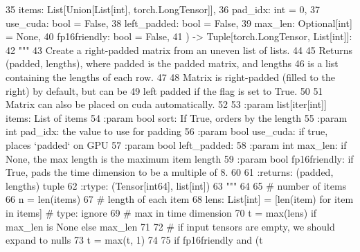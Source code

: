 \begin{DoxyCode}
35     items: List[Union[List[int], torch.LongTensor]],
36     pad\_idx: int = 0,
37     use\_cuda: bool = \textcolor{keyword}{False},
38     left\_padded: bool = \textcolor{keyword}{False},
39     max\_len: Optional[int] = \textcolor{keywordtype}{None},
40     fp16friendly: bool = \textcolor{keyword}{False},
41 ) -> Tuple[torch.LongTensor, List[int]]:
42     \textcolor{stringliteral}{"""}
43 \textcolor{stringliteral}{    Create a right-padded matrix from an uneven list of lists.}
44 \textcolor{stringliteral}{}
45 \textcolor{stringliteral}{    Returns (padded, lengths), where padded is the padded matrix, and lengths}
46 \textcolor{stringliteral}{    is a list containing the lengths of each row.}
47 \textcolor{stringliteral}{}
48 \textcolor{stringliteral}{    Matrix is right-padded (filled to the right) by default, but can be}
49 \textcolor{stringliteral}{    left padded if the flag is set to True.}
50 \textcolor{stringliteral}{}
51 \textcolor{stringliteral}{    Matrix can also be placed on cuda automatically.}
52 \textcolor{stringliteral}{}
53 \textcolor{stringliteral}{    :param list[iter[int]] items: List of items}
54 \textcolor{stringliteral}{    :param bool sort: If True, orders by the length}
55 \textcolor{stringliteral}{    :param int pad\_idx: the value to use for padding}
56 \textcolor{stringliteral}{    :param bool use\_cuda: if true, places `padded` on GPU}
57 \textcolor{stringliteral}{    :param bool left\_padded:}
58 \textcolor{stringliteral}{    :param int max\_len: if None, the max length is the maximum item length}
59 \textcolor{stringliteral}{    :param bool fp16friendly: if True, pads the time dimension to be a multiple of 8.}
60 \textcolor{stringliteral}{}
61 \textcolor{stringliteral}{    :returns: (padded, lengths) tuple}
62 \textcolor{stringliteral}{    :rtype: (Tensor[int64], list[int])}
63 \textcolor{stringliteral}{    """}
64 
65     \textcolor{comment}{# number of items}
66     n = len(items)
67     \textcolor{comment}{# length of each item}
68     lens: List[int] = [len(item) \textcolor{keywordflow}{for} item \textcolor{keywordflow}{in} items]  \textcolor{comment}{# type: ignore}
69     \textcolor{comment}{# max in time dimension}
70     t = max(lens) \textcolor{keywordflow}{if} max\_len \textcolor{keywordflow}{is} \textcolor{keywordtype}{None} \textcolor{keywordflow}{else} max\_len
71 
72     \textcolor{comment}{# if input tensors are empty, we should expand to nulls}
73     t = max(t, 1)
74 
75     \textcolor{keywordflow}{if} fp16friendly \textcolor{keywordflow}{and} (t %

\end{DoxyCode}
